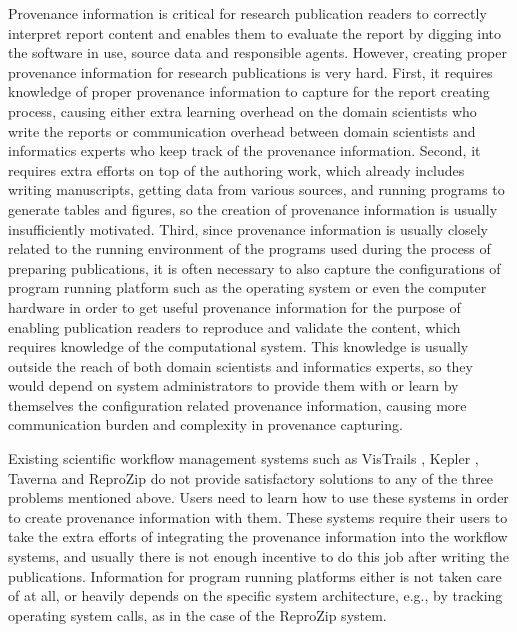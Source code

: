  
 
Provenance information is critical for research publication readers to correctly interpret report content and enables them to evaluate the report by digging into the software in use, source data and responsible agents. However, creating proper provenance information for research publications is very hard. First, it requires knowledge of proper provenance information to capture for the report creating process, causing either extra learning overhead on the domain scientists who write the reports or communication overhead between domain scientists and informatics experts who keep track of the provenance information. Second, it requires extra efforts on top of the authoring work, which already includes writing manuscripts, getting data from various sources, and running programs to generate tables and figures, so the creation of provenance information is usually insufficiently motivated. Third, since provenance information is usually closely related to the running environment of the programs used during the process of preparing publications, it is often necessary to also capture the configurations of program running platform such as the operating system or even the computer hardware in order to get useful provenance information for the purpose of enabling publication readers to reproduce and validate the content, which requires knowledge of the computational system. This knowledge is usually outside the reach of both domain scientists and informatics experts, so they would depend on system administrators to provide them with or learn by themselves the configuration related provenance information, causing more communication burden and complexity in provenance capturing.

Existing scientific workflow management systems such as VisTrails \cite{Freire2014}, Kepler \cite{Ludascher2005}, Taverna \cite{Taverna} and ReproZip \cite{Chirigati2013} do not provide satisfactory solutions to any of the three problems mentioned above. Users need to learn how to use these systems in order to create provenance information with them. These systems require their users to take the extra efforts of integrating the provenance information into the workflow systems, and usually there is not enough incentive to do this job after writing the publications. Information for program running platforms either is not taken care of at all, or heavily depends on the specific system architecture, e.g., by tracking operating system calls, as in the case of the ReproZip system. 

